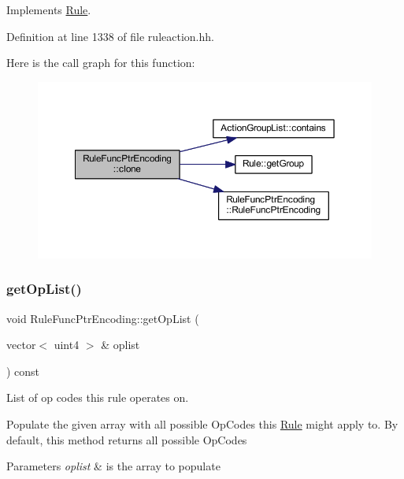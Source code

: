 Implements \mbox{\hyperlink{class_rule_a70de90a76461bfa7ea0b575ce3c11e4d}{Rule}}.



Definition at line 1338 of file ruleaction.\+hh.

Here is the call graph for this function\+:
\nopagebreak
\begin{figure}[H]
\begin{center}
\leavevmode
\includegraphics[width=350pt]{class_rule_func_ptr_encoding_a6738c42c8cf1be1152c573c815206876_cgraph}
\end{center}
\end{figure}
\mbox{\label{class_rule_func_ptr_encoding_a8f25db221c10666f0857bc9650f46113}} 
\subsubsection{\texorpdfstring{getOpList()}{getOpList()}}
{\footnotesize\ttfamily void Rule\+Func\+Ptr\+Encoding\+::get\+Op\+List (\begin{DoxyParamCaption}\item[{vector$<$ uint4 $>$ \&}]{oplist }\end{DoxyParamCaption}) const\hspace{0.3cm}{\ttfamily [virtual]}}



List of op codes this rule operates on. 

Populate the given array with all possible Op\+Codes this \mbox{\hyperlink{class_rule}{Rule}} might apply to. By default, this method returns all possible Op\+Codes 
\begin{DoxyParams}{Parameters}
{\em oplist} & is the array to populate \\
\hline
\end{DoxyParams}


